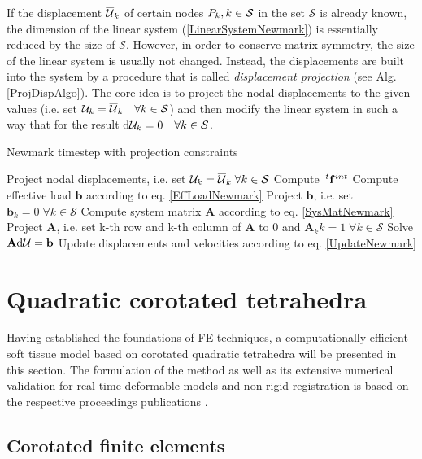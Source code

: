 If the displacement $\overline{\mathcal{U} }_k$ of certain nodes $P_k,  k \in \mathcal{S}$ in the set $\mathcal{S}$ is already known, the dimension of the linear system (\ref{LinearSystemNewmark}) is essentially reduced by the size of $\mathcal{S}$. However, in order to conserve matrix symmetry, the size of the linear system is usually not changed. Instead, the displacements are built into the system by a procedure that is called \emph{displacement projection} (see Alg. \ref{ProjDispAlgo}). The core idea is to project the nodal displacements to the given values (i.e. set $\mathcal{U} _k = \overline{\mathcal{U} }_k \quad \forall k \in \mathcal{S}$) and then modify the linear system in such a way that for the result $\textnormal{d}{\mathcal{U}} _k=0 \quad \forall k \in \mathcal{S}$.

\begin{algorithm}  
\caption{Newmark timestep with projection constraints}
\label{ProjDispAlgo}
  \begin{algorithmic}
	\State Project nodal displacements, i.e. set $\mathcal{U} _k = \overline{\mathcal{U} }_k \; \forall k \in \mathcal{S}$
	\State Compute $\mth \mfint$		
	\State Compute effective load $\mathbf{b}$ according to eq. \ref{EffLoadNewmark}
	\State Project $\mathbf{b}$, i.e. set $\mathbf{b}_k = 0 \; \forall k \in \mathcal{S}$
	\State Compute system matrix $\mathbf{A}$  according to eq. \ref{SysMatNewmark}
	\State Project $\mathbf{A}$, i.e. set k-th row and k-th column of $\mathbf{A}$ to 0 and $\mathbf{A}_kk=1 \; \forall k \in \mathcal{S}$
	\State Solve $\mathbf{ A } \textnormal{d}{\mathcal{U}}  = \mathbf{ b }$
	\State Update displacements and velocities according to eq. \ref{UpdateNewmark}
  \end{algorithmic}
\end{algorithm}


\section{Quadratic corotated tetrahedra}
Having established the foundations of FE techniques, a computationally efficient soft tissue model based on corotated quadratic tetrahedra will be presented in this section. The formulation of the method as well as its extensive numerical validation for real-time deformable models and non-rigid registration is based on the respective proceedings publications \cite{Suwelack2011a} \cite{Suwelack2013}.

\subsection{Corotated finite elements}

